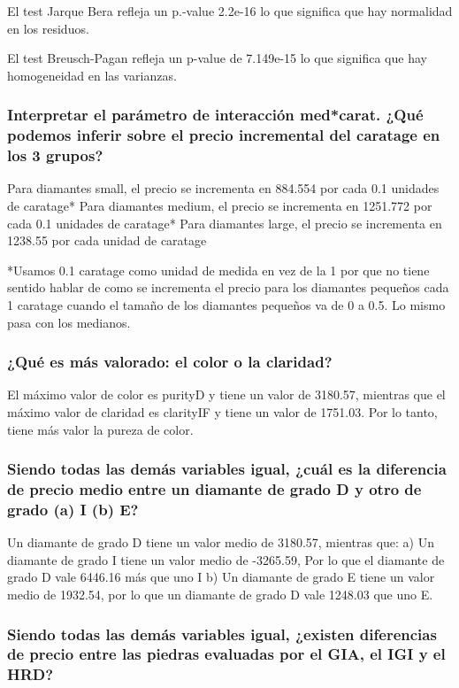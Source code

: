 \documentclass[a4paper, 9pt]{article}
\begin{document}
El test Jarque Bera refleja un p.-value 2.2e-16 lo que significa que hay normalidad en los residuos.

El test Breusch-Pagan refleja un p-value de 7.149e-15 lo que significa que hay homogeneidad en las varianzas.

\subsubsection{Interpretar el parámetro de interacción med*carat. ¿Qué podemos inferir sobre el precio incremental del caratage en los 3 grupos?}

Para diamantes small, el precio se incrementa en 884.554 por cada 0.1 unidades de caratage*
Para diamantes medium, el precio se incrementa en 1251.772 por cada 0.1 unidades de caratage*
Para diamantes large, el precio se incrementa en 1238.55 por cada unidad de caratage

*Usamos 0.1 caratage como unidad de medida en vez de la 1 por que no tiene sentido hablar de como se incrementa el precio para los diamantes pequeños cada 1 caratage cuando el tamaño de los diamantes pequeños va de 0 a 0.5. Lo mismo pasa con los medianos.


\subsubsection{¿Qué es más valorado: el color o la claridad? }
El máximo valor de color es purityD y tiene un valor de 3180.57, mientras que el máximo valor de claridad es clarityIF y tiene un valor de 1751.03. Por lo tanto, tiene más valor la pureza de color.

\subsubsection{Siendo todas las demás variables igual, ¿cuál es la diferencia de precio medio entre un diamante de grado D y otro de grado (a) I (b) E? }

Un diamante de grado D tiene un valor medio de 3180.57, mientras que:
a) Un diamante de grado I tiene un valor medio de -3265.59, Por lo que el diamante de grado D vale 6446.16 más que uno I
b) Un diamante de grado E tiene un valor medio de 1932.54, por lo que un diamante de grado D vale 1248.03 que uno E.

\subsubsection{Siendo todas las demás variables igual, ¿existen diferencias de precio entre las piedras evaluadas por el GIA, el IGI y el HRD? }
\end{document}
